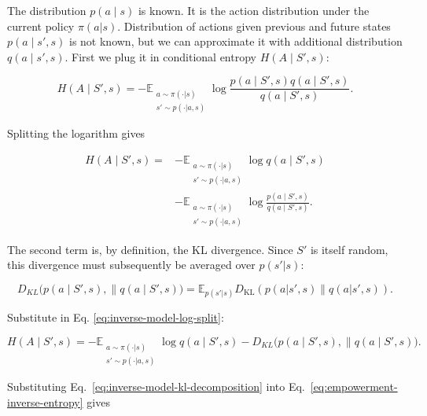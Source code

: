The distribution $p(a \mid s)$ is known. It is the action distribution under the current policy $\pi(a|s)$.
Distribution of actions given previous and future states $p(a \mid s',s)$ is not known, but we can approximate it with additional distribution $q(a \mid s',s)$. First we plug it in conditional entropy $H(A\mid S',s)$:

\begin{equation}
H(A\mid S',s)
= -\mathbb{E}_{\substack{
      a \sim \pi(\cdot|s) \\
      s' \sim p(\cdot|a,s)
    }}
\log\frac{p(a\mid S',s)q(a\mid S',s)}{q(a\mid S',s)}.
\label{eq:inverse-model-auxiliary-distribution}
\end{equation}

Splitting the logarithm gives

\begin{equation}
\begin{aligned}
H(A\mid S',s)
={}&-\mathbb{E}_{\substack{
      a \sim \pi(\cdot|s) \\
      s' \sim p(\cdot|a,s)
    }}\log q(a\mid S',s) \\
&-\mathbb{E}_{\substack{
      a \sim \pi(\cdot|s) \\
      s' \sim p(\cdot|a,s)
    }}
\log\frac{p(a\mid S',s)}{q(a\mid S',s)}.
\end{aligned}
\label{eq:inverse-model-log-split}
\end{equation}

The second term is, by definition, the KL divergence. Since $S'$ is itself random, this divergence must subsequently be averaged over $p(s'|s)$:

\begin{equation}
D_{KL}\bigl(p(a \mid S',s),\| q(a \mid S', s) \bigr) = \mathbb{E}_{p(s'|s)} D_{\mathrm{KL}}
\left(
p(a|s',s)\|q(a|s',s)
\right).
\end{equation}

Substitute in Eq. \ref{eq:inverse-model-log-split}:

\begin{equation}
H(A\mid S',s)
= -\mathbb{E}_{\substack{
      a \sim \pi(\cdot|s) \\
      s' \sim p(\cdot|a,s)
    }}\log q(a\mid S',s)
-D_{KL}\bigl(p(a \mid S',s),\| q(a \mid S', s) \bigr).
\label{eq:inverse-model-kl-decomposition}
\end{equation}

Substituting Eq.~\eqref{eq:inverse-model-kl-decomposition} into
Eq.~\eqref{eq:empowerment-inverse-entropy} gives


